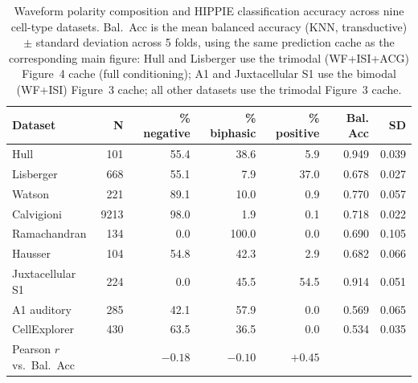 \begin{table}[h!]
\centering
\caption{Waveform polarity composition and HIPPIE classification accuracy across nine cell-type datasets. Bal.\ Acc is the mean balanced accuracy (KNN, transductive) $\pm$ standard deviation across 5 folds, using the same prediction cache as the corresponding main figure: Hull and Lisberger use the trimodal (WF+ISI+ACG) Figure~4 cache (full conditioning); A1 and Juxtacellular S1 use the bimodal (WF+ISI) Figure~3 cache; all other datasets use the trimodal Figure~3 cache.}
\label{tab:polarity_between}
\begin{tabular}{lrrrrrr}
\hline
\textbf{Dataset} & \textbf{N} & \textbf{\% negative} & \textbf{\% biphasic} & \textbf{\% positive} & \textbf{Bal. Acc} & \textbf{SD} \\
\hline
Hull                 &  101  & 55.4 &  38.6 &   5.9 & 0.949 & 0.039 \\
Lisberger            &  668  & 55.1 &   7.9 &  37.0 & 0.678 & 0.027 \\
Watson               &  221  & 89.1 &  10.0 &   0.9 & 0.770 & 0.057 \\
Calvigioni           & 9213  & 98.0 &   1.9 &   0.1 & 0.718 & 0.022 \\
Ramachandran         &  134  &  0.0 & 100.0 &   0.0 & 0.690 & 0.105 \\
Hausser              &  104  & 54.8 &  42.3 &   2.9 & 0.682 & 0.066 \\
Juxtacellular S1     &  224  &  0.0 &  45.5 &  54.5 & 0.914 & 0.051 \\
A1 auditory          &  285  & 42.1 &  57.9 &   0.0 & 0.569 & 0.065 \\
CellExplorer         &  430  & 63.5 &  36.5 &   0.0 & 0.534 & 0.035 \\
\hline
\multicolumn{2}{l}{Pearson $r$ vs.\ Bal.\ Acc} & $-0.18$ & $-0.10$ & $+0.45$ & & \\
\hline
\end{tabular}
\end{table}

